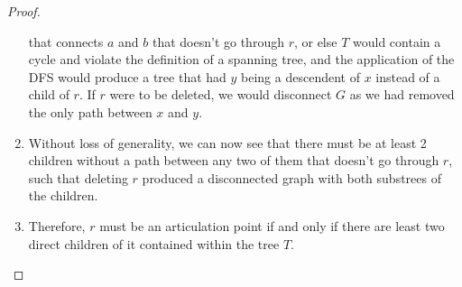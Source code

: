 \documentclass{article}
\begin{document}
\begin{proof}
\begin{enumerate}
                  that connects \(a\) and \(b\) that doesn't go through \(r\), or else \(T\)
                  would contain a cycle and violate the definition of a spanning tree, and the
                  application of the DFS would produce a tree that had \(y\) being a descendent
                  of \(x\) instead of a child of \(r\). If \(r\) were to be deleted, we would
                  disconnect \(G\) as we had removed the only path between \(x\) and \(y\).
            \item Without loss of generality, we can now see that there must be at least 2
                  children without a path between any two of them that doesn't go through \(r\),
                  such that deleting \(r\) produced a disconnected graph with both substrees of
                  the children.
            \item Therefore, \(r\) must be an articulation point if and only if there are
                  least two direct children of it contained within the tree \(T\).
      \end{enumerate}
\end{proof}
\end{document}
